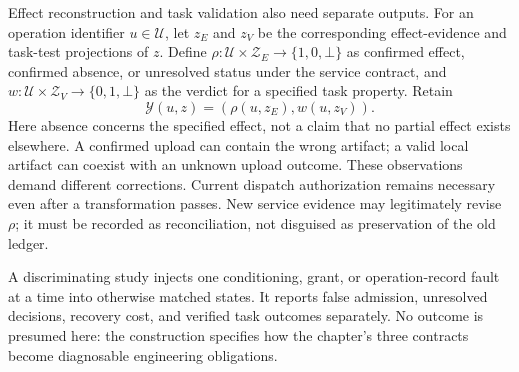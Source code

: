 Effect reconstruction and task validation also need separate outputs. For an operation identifier $u\in\mathcal U$, let $z_E$ and $z_V$ be the corresponding effect-evidence and task-test projections of $z$. Define $\rho:\mathcal U\times\mathcal Z_E\to\{1,0,\bot\}$ as confirmed effect, confirmed absence, or unresolved status under the service contract, and $w:\mathcal U\times\mathcal Z_V\to\{0,1,\bot\}$ as the verdict for a specified task property. Retain
\begin{equation}
\label{eq:C01:effecttaskpair}
 \mathcal Y(u,z)=(\rho(u,z_E),w(u,z_V)).
\end{equation}
Here absence concerns the specified effect, not a claim that no partial effect exists elsewhere. A confirmed upload can contain the wrong artifact; a valid local artifact can coexist with an unknown upload outcome. These observations demand different corrections. Current dispatch authorization remains necessary even after a transformation passes. New service evidence may legitimately revise $\rho$; it must be recorded as reconciliation, not disguised as preservation of the old ledger.

A discriminating study injects one conditioning, grant, or operation-record fault at a time into otherwise matched states. It reports false admission, unresolved decisions, recovery cost, and verified task outcomes separately. No outcome is presumed here: the construction specifies how the chapter's three contracts become diagnosable engineering obligations.
